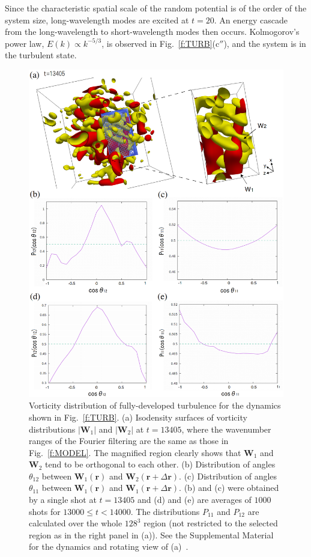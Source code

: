 \documentclass[aps,onecolumn,pra,longbibliography]{revtex4}
\begin{document}
	Since the characteristic spatial scale of the random potential is
	of the order of the system size,
	long-wavelength modes are excited at $t=20$.
	An energy cascade from the long-wavelength to short-wavelength modes then occurs.
	Kolmogorov's power law,
	$E(k) \propto k^{-5/3}$, is observed in Fig.~\ref{f:TURB}(c$''$),
	and the system is in the turbulent state.
	\begin{figure}[t]
		\centering
		\includegraphics[width=13cm]{FIG5.eps}
		\caption{
			Vorticity distribution of fully-developed turbulence for the dynamics
			shown in Fig.~\ref{f:TURB}.
			(a) Isodensity surfaces of vorticity distributions $|\bm{W}_1|$
			and $|\bm{W}_2|$ at $t=13405$, where the wavenumber ranges of
			the Fourier filtering are the same as those in Fig.~\ref{f:MODEL}.
			The magnified region clearly shows that $\bm{W}_1$ and $\bm{W}_2$
			tend to be orthogonal to each other.
			(b) Distribution of angles $\theta_{12}$ between $\bm{W}_1(\bm{r})$
			and $\bm{W}_2(\bm{r}+\Delta\bm{r})$.
			(c) Distribution of angles $\theta_{11}$ between $\bm{W}_1(\bm{r})$
			and $\bm{W}_1(\bm{r}+\Delta\bm{r})$.
			(b) and (c) were obtained by a single shot at
			$t=13405$ and (d) and (e) are averages of $1000$ shots for
			$13000 \leq t < 14000$.
			The distributions $P_{11}$ and $P_{12}$ are calculated over the whole
			$128^3$ region (not restricted to the selected region as
			in the right panel in (a)).
			See the Supplemental Material for the dynamics and rotating view of (a)~\cite{SM}.
		}
		\label{f:ANTIPARA}
	\end{figure}
\end{document}
